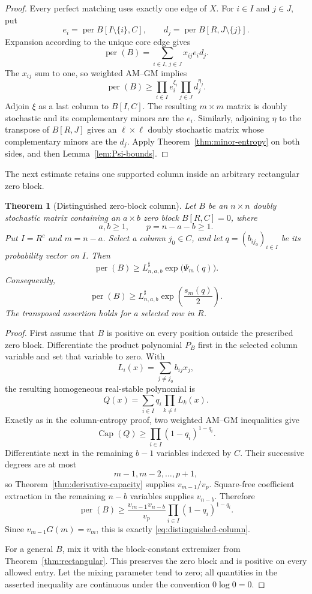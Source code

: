 \documentclass[11pt]{article}
\newtheorem{theorem}{Theorem}[section]
\theoremstyle{definition}
\newcommand{\per}{\operatorname{per}}
\newcommand{\pcap}{\operatorname{Cap}}
\newcommand{\1}{\mathbf{1}}
\begin{document}
\begin{proof}
Every perfect matching uses exactly one edge of $X$.  For $i\in I$ and
$j\in J$, put
\[
 e_i=\per B[I\setminus\{i\},C],
 \qquad
 d_j=\per B[R,J\setminus\{j\}].
\]
Expansion according to the unique core edge gives
\[
 \per(B)=\sum_{i\in I,\,j\in J}x_{ij}e_id_j.
\]
The $x_{ij}$ sum to one, so weighted AM--GM implies
\[
 \per(B)\ge
 \prod_{i\in I}e_i^{\xi_i}
 \prod_{j\in J}d_j^{\eta_j}.
\]
Adjoin $\xi$ as a last column to $B[I,C]$.  The resulting $m\times m$
matrix is doubly stochastic and its complementary minors are the $e_i$.
Similarly, adjoining $\eta$ to the transpose of $B[R,J]$ gives an
$\ell\times\ell$ doubly stochastic matrix whose complementary minors are
the $d_j$.  Apply Theorem~\ref{thm:minor-entropy} on both sides, and then
Lemma~\ref{lem:Psi-bounds}.
\end{proof}

The next estimate retains one supported column inside an arbitrary
rectangular zero block.

\begin{theorem}[Distinguished zero-block column]\label{thm:distinguished-column}
Let $B$ be an $n\times n$ doubly stochastic matrix containing an
$a\times b$ zero block $B[R,C]=0$, where
\[
 a,b\ge1,\qquad p=n-a-b\ge1.
\]
Put $I=R^c$ and $m=n-a$.  Select a column $j_0\in C$, and let
$q=(b_{ij_0})_{i\in I}$ be its probability vector on $I$.  Then
\begin{equation}\label{eq:distinguished-column}
 \per(B)\ge
 L^{\sharp}_{n,a,b}\exp\bigl(\Psi_m(q)\bigr).
\end{equation}
Consequently,
\[
 \per(B)\ge
 L^{\sharp}_{n,a,b}\exp\left(\frac{s_m(q)}2\right).
\]
The transposed assertion holds for a selected row in $R$.
\end{theorem}

\begin{proof}
First assume that $B$ is positive on every position outside the prescribed
zero block.  Differentiate the product polynomial $P_B$ first in the
selected column variable and set that variable to zero.  With
\[
 L_i(x)=\sum_{j\ne j_0}b_{ij}x_j,
\]
the resulting homogeneous real-stable polynomial is
\[
 Q(x)=\sum_{i\in I}q_i\prod_{k\ne i}L_k(x).
\]
Exactly as in the column-entropy proof, two weighted AM--GM inequalities give
\[
 \pcap(Q)\ge\prod_{i\in I}(1-q_i)^{1-q_i}.
\]
Differentiate next in the remaining $b-1$ variables indexed by $C$.
Their successive degrees are at most
\[
 m-1,m-2,\dots,p+1,
\]
so Theorem~\ref{thm:derivative-capacity} supplies
$v_{m-1}/v_p$.  Square-free coefficient extraction in the remaining
$n-b$ variables supplies $v_{n-b}$.  Therefore
\[
 \per(B)\ge
 \frac{v_{m-1}v_{n-b}}{v_p}
 \prod_{i\in I}(1-q_i)^{1-q_i}.
\]
Since $v_{m-1}G(m)=v_m$, this is exactly
\eqref{eq:distinguished-column}.

For a general $B$, mix it with the block-constant extremizer from
Theorem~\ref{thm:rectangular}.  This preserves the zero block and is
positive on every allowed entry.  Let the mixing parameter tend to zero;
all quantities in the asserted inequality are continuous under the
convention $0\log0=0$.
\end{proof}
\end{document}
